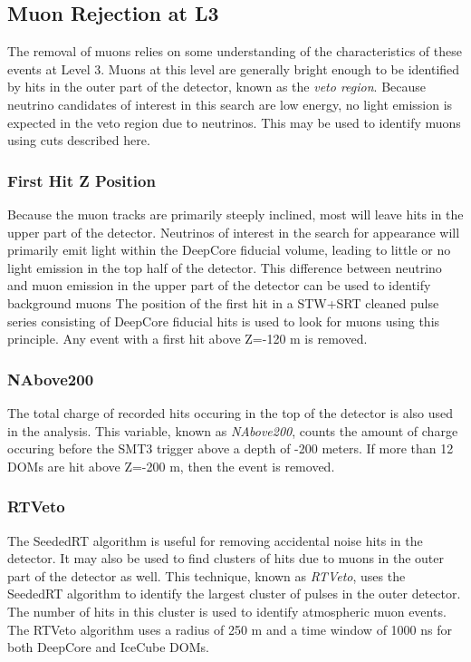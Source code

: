\label{subsec:level3_muons}
\subsection{Muon Rejection at L3}
The removal of muons relies on some understanding of the characteristics of these events at Level 3.
Muons at this level are generally bright enough to be identified by hits in the outer part of the detector, known as the \emph{veto region}.
Because neutrino candidates of interest in this search are low energy, no light emission is expected in the veto region due to neutrinos.
This may be used to identify muons using cuts described here.

\subsubsection{First Hit Z Position}
Because the muon tracks are primarily steeply inclined, most will leave hits in the upper part of the detector.
Neutrinos of interest in the search for appearance will primarily emit light within the DeepCore fiducial volume, leading to little or no light emission in the top half of the detector. 
This difference between neutrino and muon emission in the upper part of the detector can be used to identify background muons
The position of the first hit in a STW+SRT cleaned pulse series consisting of DeepCore fiducial hits is used to look for muons using this principle.
Any event with a first hit above Z=-120 m is removed.

\subsubsection{NAbove200}
The total charge of recorded hits occuring in the top of the detector is also used in the analysis. 
This variable, known as \emph{NAbove200}, counts the amount of charge occuring before the SMT3 trigger above a depth of -200 meters.
If more than 12 DOMs are hit above Z=-200 m, then the event is removed.

\subsubsection{RTVeto}
The SeededRT algorithm is useful for removing accidental noise hits in the detector.
It may also be used to find clusters of hits due to muons in the outer part of the detector as well.
This technique, known as \emph{RTVeto}, uses the SeededRT algorithm to identify the largest cluster of pulses in the outer detector.
The number of hits in this cluster is used to identify atmospheric muon events.
The RTVeto algorithm uses a radius of 250 m and a time window of 1000 ns for both DeepCore and IceCube DOMs.

